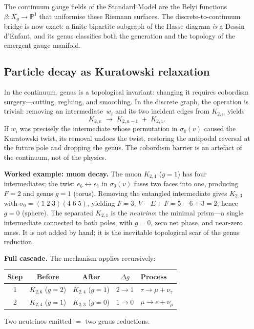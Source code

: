 \documentclass[aps,prd,twocolumn,superscriptaddress,nofootinbib,amsmath,amssymb,longbibliography]{revtex4-2}
\newcommand{\Kbn}{K_{2,n}}
\begin{document}
The continuum gauge fields of the Standard Model are the
Belyi functions $\beta\colon X_g \to \mathbb{P}^1$ that uniformise
these Riemann surfaces.
The discrete-to-continuum bridge is now exact: a finite bipartite
subgraph of the Hasse diagram \emph{is} a Dessin d'Enfant, and its
genus classifies both the generation and the topology of the emergent
gauge manifold.

\subsection{Particle decay as Kuratowski relaxation}\label{sec:decay}

In the continuum, genus is a topological invariant: changing it requires
cobordism surgery---cutting, regluing, and smoothing.
In the discrete graph, the operation is trivial: removing an
intermediate~$w_i$ and its two incident edges from $\Kbn$ yields
\begin{equation}
  K_{2,n} \;\longrightarrow\; K_{2,n-1} \;+\; K_{2,1}.
  \label{eq:kuratowski-relaxation}
\end{equation}
If $w_i$ was precisely the intermediate whose permutation in
$\sigma_0(v)$ caused the Kuratowski twist, its removal undoes the
twist, restoring the antipodal reversal at the future pole and dropping
the genus.
The cobordism barrier is an artefact of the continuum, not of the
physics.

\textbf{Worked example: muon decay.}
The muon $K_{2,4}$ ($g = 1$) has four intermediates; the twist
$e_6 \leftrightarrow e_7$ in $\sigma_0(v)$ fuses two faces into one,
producing $F = 2$ and genus $g = 1$ (torus).
Removing the entangled intermediate gives $K_{2,3}$ with
$\sigma_0 = (1\;2\;3)(4\;6\;5)$, yielding $F = 3$,
$V - E + F = 5 - 6 + 3 = 2$, hence $g = 0$ (sphere).
The separated $K_{2,1}$ is the \emph{neutrino}: the minimal prism---a
single intermediate connected to both poles, with $g = 0$, zero net
phase, and near-zero mass.
It is not added by hand; it is the inevitable topological scar of the
genus reduction.

\textbf{Full cascade.}
The mechanism applies recursively:
\begin{center}
\setlength{\tabcolsep}{4pt}
\begin{tabular}{@{}ccccl@{}}
\toprule
Step & Before & After & $\Delta g$ & Process \\
\midrule
1 & $K_{2,6}$ ($g{=}2$) & $K_{2,4}$ ($g{=}1$) & $2 \to 1$
  & $\tau \to \mu + \nu_\tau$ \\
2 & $K_{2,4}$ ($g{=}1$) & $K_{2,3}$ ($g{=}0$) & $1 \to 0$
  & $\mu \to e + \nu_\mu$ \\
\bottomrule
\end{tabular}
\end{center}
Two neutrinos emitted $=$ two genus reductions.
\end{document}
